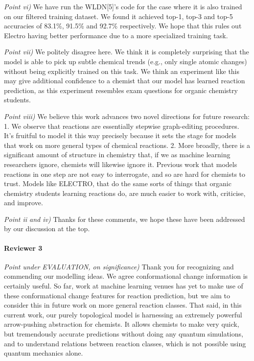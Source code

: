 \documentclass{article}
\begin{document}
\emph{Point vi)} We have run the WLDN[5]'s code for the case where it is also trained on our filtered training dataset.
 We found it achieved top-1, top-3 and top-5 accuracies of 83.1\%, 91.5\% and 92.7\% respectively. 
 We hope that this rules out Electro having better performance due to a more specialized training task.
  
\emph{Point vii)}
 We politely disagree here. We think it is completely surprising that the model is able to pick up subtle chemical trends (e.g., only single atomic changes) without being explicitly trained on this task. We think an experiment like this may give additional confidence to a chemist that our model has learned reaction prediction, as this experiment resembles exam questions for organic chemistry students. 
 
\emph{Point viii)}
We believe this work advances two novel directions for future research: 1. We observe that reactions are essentially stepwise graph-editing procedures. It’s fruitful to model it this way precisely because it sets the stage for models that work on more general types of chemical reactions. 2. More broadly, there is a significant amount of structure in chemistry that, if we as machine learning researchers ignore, chemists will likewise ignore it. Previous work that models reactions in one step are not easy to interrogate, and so are hard for chemists to trust. Models like ELECTRO, that do the same sorts of things that organic chemistry students learning reactions do, are much easier to work with, criticise, and improve.

 
\emph{Point ii and iv)} Thanks for these comments, we hope these have been addressed by our discussion at the top.



\paragraph{Reviewer 3}
\emph{Point under EVALUATION, on significance)}
Thank you for recognizing and commending our modelling ideas. We agree conformational change information is certainly useful. So far, work at machine learning venues has yet to make use of these conformational change features for reaction prediction, but we aim to consider this in future work on more general reaction classes. That said, in this current work, our purely topological model is harnessing an extremely powerful arrow-pushing abstraction for chemists. It allows chemists to make very quick, but tremendously accurate predictions without doing any quantum simulations, and to understand relations between reaction classes, which is not possible using quantum mechanics alone. 
\end{document}
